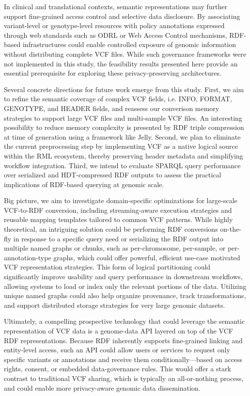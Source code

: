 \documentclass[unnumsec,webpdf,contemporary,large]{oup-authoring-template}
\begin{document}
In clinical and translational contexts, semantic representations may further support fine-grained access control and selective data disclosure. 
By associating variant-level or genotype-level resources with policy annotations expressed through web standards such as ODRL or Web Access Control mechanisms, RDF-based infrastructures could enable controlled exposure of genomic information without distributing complete VCF files. 
While such governance frameworks were not implemented in this study, the feasibility results presented here provide an essential prerequisite for exploring these privacy-preserving architectures.

Several concrete directions for future work emerge from this study. 
First, we aim to refine the semantic coverage of complex VCF fields, i.e. INFO, FORMAT, GENOTYPE, and HEADER fields, and reassess our converison memory strategies to support large VCF files and multi-sample VCF files. 
An interesting possibility to reduce memory complexity is presented by RDF triple compression at time of generation using a framework like Jelly\cite{sowinski_jelly_2025}.
Second, we plan to eliminate the current preprocessing step by implementing VCF as a native logical source within the RML ecosystem, thereby preserving header metadata and simplifying workflow integration. 
Third, we intend to evaluate SPARQL query performance over serialized and HDT-compressed RDF outputs to assess the practical implications of RDF-based querying at genomic scale.

Big picture, we aim to investigate domain-specific optimizations for large-scale VCF-to-RDF conversion, including streaming-aware execution strategies and reusable mapping templates tailored to common VCF patterns. 
While highly theoretical, an intriguing solution could be performing RDF conversions on-the-fly in response to a specific query need or serializing the RDF output into multiple named graphs or chunks, such as per-chromosome, per-sample, or per-annotation-type graphs, which could offer powerful, efficient use-case motivated VCF representation strategies. 
This form of logical partitioning could significantly improve usability and query performance in downstream workflows, allowing systems to load or index only the relevant portions of the data. 
Utilizing unique named graphs could also help organize provenance, track transformations, and support distributed storage strategies for very large genomic datasets.

Ultimately, a compelling prospective technology that could leverage the semantic representation of VCF data is a genome-data API layered on top of the VCF RDF representations. 
Because RDF inherently supports fine-grained linking and entity-level access, such an API could allow users or services to request only specific variants or annotations and receive them conditionally—based on access rights, consent, or embedded data-governance rules. 
This would offer a stark contrast to traditional VCF sharing, which is typically an all-or-nothing process, and could enable more privacy-aware genomic data dissemination.
\end{document}
